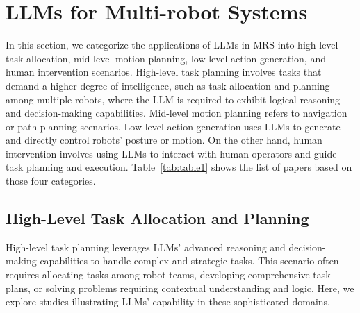\section{LLMs for Multi-robot Systems}\label{sec:4-LLM-MRS}
In this section, we categorize the applications of LLMs in MRS into high-level task allocation, mid-level motion planning, low-level action generation, and human intervention scenarios. High-level task planning involves tasks that demand a higher degree of intelligence, such as task allocation and planning among multiple robots, where the LLM is required to exhibit logical reasoning and decision-making capabilities. Mid-level motion planning refers to navigation or path-planning scenarios. Low-level action generation uses LLMs to generate and directly control robots' posture or motion. On the other hand, human intervention involves using LLMs to interact with human operators and guide task planning and execution. Table~\ref{tab:table1} shows the list of papers based on those four categories.
\subsection{High-Level Task Allocation and Planning}
High-level task planning leverages LLMs' advanced reasoning and decision-making capabilities to handle complex and strategic tasks. This scenario often requires allocating tasks among robot teams, developing comprehensive task plans, or solving problems requiring contextual understanding and logic. Here, we explore studies illustrating LLMs' capability in these sophisticated domains.

